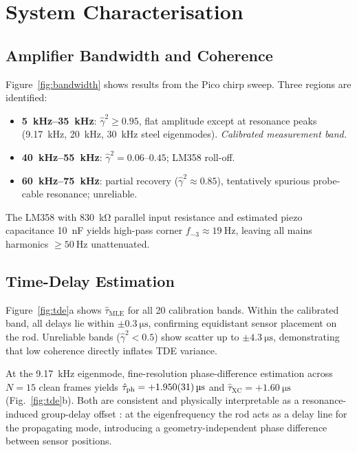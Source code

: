 \documentclass[10pt,a4paper,twocolumn]{article}
\newcommand{\gammasq}{\ensuremath{\hat{\gamma}^2}}
\newcommand{\taumle}{\ensuremath{\hat{\tau}_{\mathrm{MLE}}}}
\begin{document}
\section{System Characterisation}

\subsection{Amplifier Bandwidth and Coherence}

Figure~\ref{fig:bandwidth} shows results from the Pico chirp sweep. Three regions are identified:

\begin{itemize}[leftmargin=1.2em,itemsep=1pt,topsep=2pt]
  \item \textbf{\SIrange{5}{35}{\kilo\hertz}}: $\gammasq \geq 0.95$, flat amplitude except at resonance peaks (\SI{9.17}{\kilo\hertz}, \SI{20}{\kilo\hertz}, \SI{30}{\kilo\hertz} steel eigenmodes). \emph{Calibrated measurement band.}
  \item \textbf{\SIrange{40}{55}{\kilo\hertz}}: $\gammasq = 0.06$--$0.45$; LM358 roll-off. 
  \item \textbf{\SIrange{60}{75}{\kilo\hertz}}: partial recovery ($\gammasq\approx 0.85$), tentatively spurious probe-cable resonance; unreliable.
\end{itemize}

The LM358 with \SI{830}{\kilo\ohm} parallel input resistance and estimated piezo capacitance \SI{10}{\nano\farad} yields high-pass corner $f_{-3}\approx\SI{19}{\hertz}$, leaving all mains harmonics $\geq\SI{50}{\hertz}$ unattenuated.

\subsection{Time-Delay Estimation}

Figure~\ref{fig:tde}a shows $\taumle$ for all 20 calibration bands. Within the calibrated band, all delays lie within $\pm\SI{0.3}{\micro\second}$, confirming equidistant sensor placement on the rod. Unreliable bands ($\gammasq<0.5$) show scatter up to $\pm\SI{4.3}{\micro\second}$, demonstrating that low coherence directly inflates TDE variance.

At the \SI{9.17}{\kilo\hertz} eigenmode, fine-resolution phase-difference estimation across $N=15$ clean frames yields $\hat\tau_\text{ph} = +\SI{1.950\pm0.031}{\micro\second}$ and $\hat\tau_\text{XC}=+\SI{1.60}{\micro\second}$ (Fig.~\ref{fig:tde}b). Both are consistent and physically interpretable as a resonance-induced group-delay offset \citep{Knapp1976}: at the eigenfrequency the rod acts as a delay line for the propagating mode, introducing a geometry-independent phase difference between sensor positions.
\end{document}
